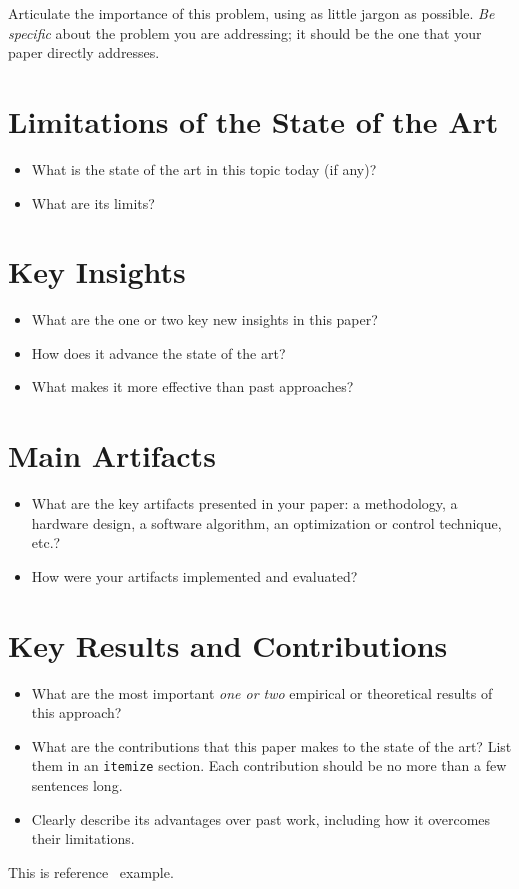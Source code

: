 \documentclass[sigconf,10pt,nonacm]{acmart}
\begin{document}
\noindent
Articulate the importance of this problem, using as little jargon as possible. \emph{Be specific}
about the problem you are addressing; it should be the one that your
paper directly addresses.

\section{Limitations of the State of the Art}
\label{sec:limitations}

\begin{itemize}
\item What is the state of the art in this topic today (if any)?
\item What are its limits?
\end{itemize}

\section{Key Insights}
\label{sec:key-insights}

\begin{itemize}
\item What are the one or two key new insights in this paper?
\item How does it advance the state of the art?
\item What makes it more effective than past approaches?
\end{itemize}

\section{Main Artifacts}
\label{sec:main-artifacts}

\begin{itemize}
\item What are the key artifacts presented in your paper: a
  methodology, a hardware design, a software algorithm, an
  optimization or control technique, etc.?
  \item How were your artifacts implemented and evaluated? 
\end{itemize}

\section{Key Results and Contributions}
\label{sec:key-contributions}

\begin{itemize}
  \item What are the most important \emph{one or two} empirical or theoretical
    results of this approach?
  \item What are the contributions that this paper makes to the state of the
    art? List them in an \texttt{itemize} section. Each contribution should be no more than a few sentences long.
  \item Clearly describe its advantages over past work, including how it overcomes their limitations.
\end{itemize}

This is reference~\cite{lamport94} example.



\end{document}
